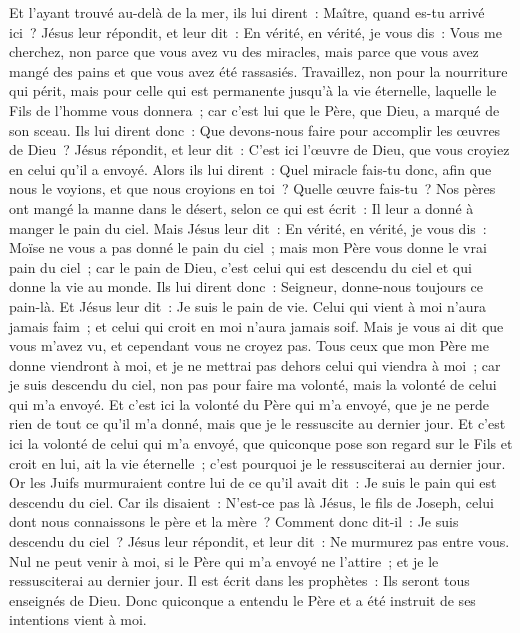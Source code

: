 \begin{multicols}{2}
Et l'ayant trouvé au-delà de la mer, ils lui dirent~: Maître, quand es-tu arrivé ici~?
Jésus leur répondit, et leur dit~: En vérité, en vérité, je vous dis~: Vous me cherchez, non parce que vous avez vu des miracles, mais parce que vous avez mangé des pains et que vous avez été rassasiés.
Travaillez, non pour la nourriture qui périt, mais pour celle qui est permanente jusqu'à la vie éternelle, laquelle le Fils de l'homme vous donnera~; car c'est lui que le Père, que Dieu, a marqué de son sceau.
Ils lui dirent donc~: Que devons-nous faire pour accomplir les œuvres de Dieu~?
Jésus répondit, et leur dit~: C'est ici l'œuvre de Dieu, que vous croyiez en celui qu'il a envoyé.
Alors ils lui dirent~: Quel miracle fais-tu donc, afin que nous le voyions, et que nous croyions en toi~? Quelle œuvre fais-tu~?
Nos pères ont mangé la manne dans le désert, selon ce qui est écrit~: Il leur a donné à manger le pain du ciel.
Mais Jésus leur dit~: En vérité, en vérité, je vous dis~: Moïse ne vous a pas donné le pain du ciel~; mais mon Père vous donne le vrai pain du ciel~;
car le pain de Dieu, c'est celui qui est descendu du ciel et qui donne la vie au monde.
Ils lui dirent donc~: Seigneur, donne-nous toujours ce pain-là.
Et Jésus leur dit~: Je suis le pain de vie. Celui qui vient à moi n'aura jamais faim~; et celui qui croit en moi n'aura jamais soif.
Mais je vous ai dit que vous m'avez vu, et cependant vous ne croyez pas.
Tous ceux que mon Père me donne viendront à moi, et je ne mettrai pas dehors celui qui viendra à moi~;
car je suis descendu du ciel, non pas pour faire ma volonté, mais la volonté de celui qui m'a envoyé.
Et c'est ici la volonté du Père qui m'a envoyé, que je ne perde rien de tout ce qu'il m'a donné, mais que je le ressuscite au dernier jour.
Et c'est ici la volonté de celui qui m'a envoyé, que quiconque pose son regard sur le Fils et croit en lui, ait la vie éternelle~; c'est pourquoi je le ressusciterai au dernier jour.
Or les Juifs murmuraient contre lui de ce qu'il avait dit~: Je suis le pain qui est descendu du ciel.
Car ils disaient~: N'est-ce pas là Jésus, le fils de Joseph, celui dont nous connaissons le père et la mère~? Comment donc dit-il~: Je suis descendu du ciel~?
Jésus leur répondit, et leur dit~: Ne murmurez pas entre vous.
Nul ne peut venir à moi, si le Père qui m'a envoyé ne l'attire~; et je le ressusciterai au dernier jour.
Il est écrit dans les prophètes~: Ils seront tous enseignés de Dieu. Donc quiconque a entendu le Père et a été instruit de ses intentions vient à moi.

\end{multicols}
